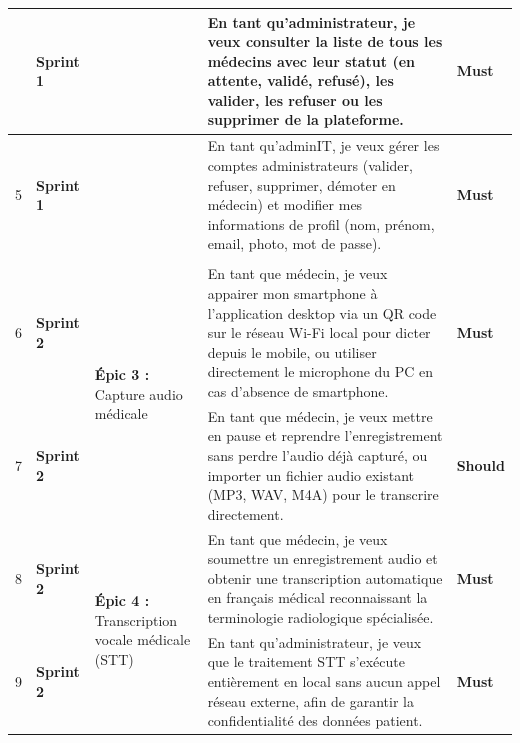 \documentclass[12pt,a4paper]{report}
\newcommand{\must}{\textcolor{must}{\textbf{Must}}}
\newcommand{\should}{\textcolor{should}{\textbf{Should}}}
\newcommand{\sprintone}[1]{\cellcolor{sprint1bg}\textcolor{sprint1txt}{\textbf{#1}}}
\newcommand{\sprinttwo}[1]{\cellcolor{sprint2bg}\textcolor{sprint2txt}{\textbf{#1}}}
\begin{document}
\begin{longtable}{
  |>{\centering\arraybackslash}p{0.7cm}
  |>{\centering\arraybackslash}p{2.2cm}
  |p{3.8cm}
  |p{6.8cm}
  |>{\centering\arraybackslash}p{1.4cm}|
}
4 & \sprintone{Sprint 1} &
  & En tant qu'administrateur, je veux consulter la liste de tous les médecins avec leur statut (en attente, validé, refusé), les valider, les refuser ou les supprimer de la plateforme.
  & \must \\ \cline{1-2}\cline{4-5}

5 & \sprintone{Sprint 1} &
  & En tant qu'adminIT, je veux gérer les comptes administrateurs (valider, refuser, supprimer, démoter en médecin) et modifier mes informations de profil (nom, prénom, email, photo, mot de passe).
  & \must \\ \hline


\multicolumn{5}{|c|}{\cellcolor{sprint2bg}\textcolor{sprint2txt}{\Large\bfseries Sprint 2 — Transcription vocale \& Création / Correction de rapports}} \\ \hline

6 & \sprinttwo{Sprint 2}
  & \multirow{2}{3.8cm}{\textbf{Épic 3 :} Capture audio médicale}
  & En tant que médecin, je veux appairer mon smartphone à l'application desktop via un QR code sur le réseau Wi-Fi local pour dicter depuis le mobile, ou utiliser directement le microphone du PC en cas d'absence de smartphone.
  & \must \\ \cline{1-2}\cline{4-5}

7 & \sprinttwo{Sprint 2} &
  & En tant que médecin, je veux mettre en pause et reprendre l'enregistrement sans perdre l'audio déjà capturé, ou importer un fichier audio existant (MP3, WAV, M4A) pour le transcrire directement.
  & \should \\ \hline

8 & \sprinttwo{Sprint 2}
  & \multirow{2}{3.8cm}{\textbf{Épic 4 :} Transcription vocale médicale (STT)}
  & En tant que médecin, je veux soumettre un enregistrement audio et obtenir une transcription automatique en français médical reconnaissant la terminologie radiologique spécialisée.
  & \must \\ \cline{1-2}\cline{4-5}

9 & \sprinttwo{Sprint 2} &
  & En tant qu'administrateur, je veux que le traitement STT s'exécute entièrement en local sans aucun appel réseau externe, afin de garantir la confidentialité des données patient.
  & \must \\ \hline


\end{longtable}
\end{document}
